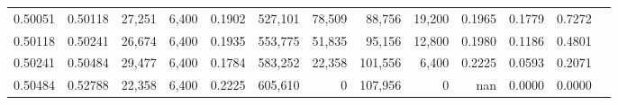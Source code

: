 \begin{tabular}{rrrrrrrrrrrrr}
0.50051 & 0.50118 & 27,251 & 6,400 &                                     0.1902 & 527,101 &  78,509 &  88,756 &  19,200 & 0.1965 & 0.1779 & 0.7272 \\
0.50118 & 0.50241 & 26,674 & 6,400 &                                     0.1935 & 553,775 &  51,835 &  95,156 &  12,800 & 0.1980 & 0.1186 & 0.4801 \\
0.50241 & 0.50484 & 29,477 & 6,400 &                                     0.1784 & 583,252 &  22,358 & 101,556 &   6,400 & 0.2225 & 0.0593 & 0.2071 \\
0.50484 & 0.52788 & 22,358 & 6,400 &                                     0.2225 & 605,610 &       0 & 107,956 &       0 &    nan & 0.0000 & 0.0000 \\
\bottomrule
\end{tabular}
